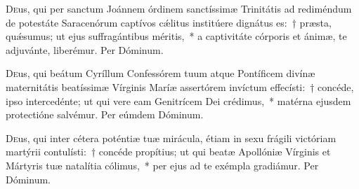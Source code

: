 \documentclass[vesperale_romanum.tex]{subfiles}
\begin{document}
\duplexmtv

\oratio

\lettrine{D}{e}us, qui per san\-ctum Joánnem órdinem san\-ctíssimæ Trinitátis ad rediméndum de potestáte Saracenórum ca\-ptívos cǽlitus institúere dignátus es:~† præsta, quǽsumus; ut ejus suffragántibus méritis,~* a ca\-ptivitáte córporis et ánimæ, te adjuvánte, liberémur.
Per Dóminum.



\myrule



\duplexmtv


\oratio

 \lettrine{D}{e}us, qui beátum Cyríllum Confessórem tuum atque Pontíficem divínæ maternitátis beatíssimæ Vírginis Maríæ assertórem inví\-ctum effecísti:~† concéde, i\-pso intercedénte; ut qui vere eam Genitrícem Dei crédimus,~* matérna ejusdem prote\-ctióne salvémur.
Per eúmdem Dóminum.



\oratio

\lettrine{D}{e}us, qui inter cétera poténtiæ tuæ mirácula, étiam in sexu frágili vi\-ctóriam martýrii contulísti:~† concéde propítius; ut qui beatæ Apollóniæ Vírginis et Mártyris tuæ natalítia cólimus,~* per ejus ad te exémpla gradiámur. Per Dóminum.

\capitdeseqquad

\myrule

\newpage

\end{document}
